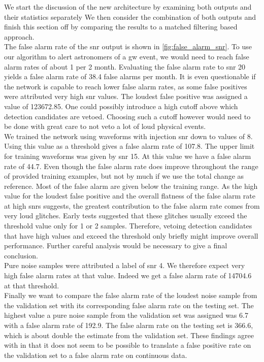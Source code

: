 We start the discussion of the new architecture by examining both outputs and their statistics separately We then consider the combination of both outputs and finish this section off by comparing the results to a matched filtering based approach.\\
The false alarm rate of the \gls{snr} output is shown in \autoref{fig:false_alarm_snr}. To use our algorithm to alert astronomers of a \gls{gw} event, we would need to reach false alarm rates of about 1 per 2 month. Evaluating the false alarm rate to \gls{snr} 20 yields a false alarm rate of 38.4 false alarms per month. It is even questionable if the network is capable to reach lower false alarm rates, as some false positives were attributed very high \gls{snr} values. The loudest false positive was assigned a value of 123672.85. One could possibly introduce a high cutoff above which detection candidates are vetoed. Choosing such a cutoff however would need to be done with great care to not veto a lot of loud physical events.\\
We trained the network using waveforms with injection \gls{snr} down to values of $8$. Using this value as a threshold gives a false alarm rate of 107.8. The upper limit for training waveforms was given by \gls{snr} 15. At this value we have a false alarm rate of 44.7. Even though the false alarm rate does improve throughout the range of provided training examples, but not by much if we use the total change as reference. Most of the false alarm are given below the training range. As the high value for the loudest false positive and the overall flatness of the false alarm rate at high \gls{snr}s suggests, the greatest contribution to the false alarm rate comes from very loud glitches. Early tests suggested that these glitches usually exceed the threshold value only for 1 or 2 samples. Therefore, vetoing detection candidates that have high values and exceed the threshold only briefly might improve overall performance. Further careful analysis would be necessary to give a final conclusion.\\
Pure noise samples were attributed a label of \gls{snr} 4. We therefore expect very high false alarm rates at that value. Indeed we get a false alarm rate of 14704.6 at that threshold.\\
Finally we want to compare the false alarm rate of the loudest noise sample from the validation set with its corresponding false alarm rate on the testing set. The highest value a pure noise sample from the validation set was assigned was 6.7 with a false alarm rate of 192.9. The false alarm rate on the testing set is 366.6, which is about double the estimate from the validation set. These findings agree with \cite{cnn_magiacal_bullet} in that it does not seem to be possible to translate a false positive rate on the validation set to a false alarm rate on continuous data.\smallskip\\
